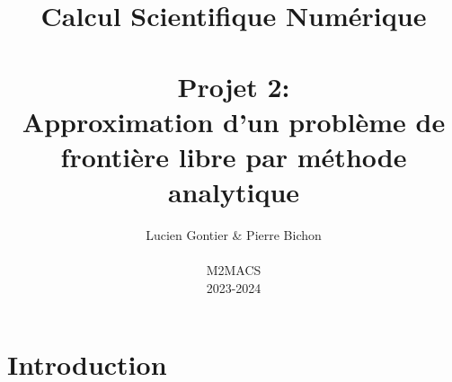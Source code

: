 \documentclass{article}
\title{\Huge{Calcul Scientifique Numérique\\\\Projet 2:\\Approximation d'un problème de frontière libre par méthode analytique}}
\author{\large{Lucien Gontier \& Pierre Bichon } \\ \\ \large{M2MACS} \\  \large{2023-2024}}
\begin{document}
\maketitle
\vspace*{25\baselineskip}
\begin{figure}[h]
\centering
{}
\end{figure}
\newpage

\section{Introduction}
\end{document}

